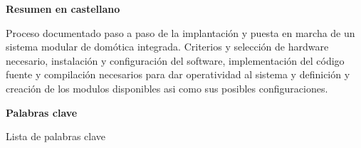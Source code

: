 
\newpage

\thispagestyle{empty}

\begin{center}

{\bf \Huge Resumen en castellano}

  \end{center}
\vspace{1cm}

Proceso documentado paso a paso de la implantación y puesta en marcha de un sistema modular de domótica integrada. Criterios y selección de hardware necesario, instalación y configuración del software, implementación del código fuente y compilación necesarios para dar operatividad al sistema y definición y creación de los modulos disponibles asi como sus posibles configuraciones.

\vspace{1cm}


\begin{center}

{\bf \Large Palabras clave}

   \end{center}

   \vspace{0.5cm}
   
   Lista de palabras clave
   



